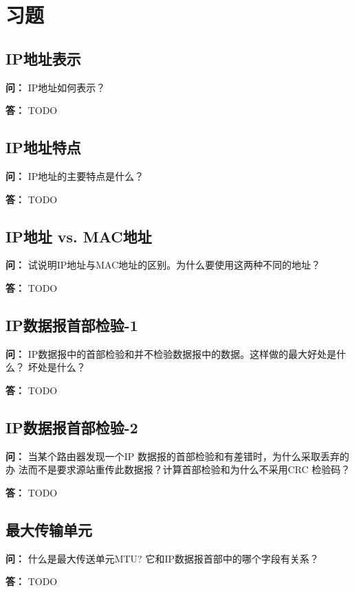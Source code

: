 \documentclass[12pt,hyperref,a4paper,UTF8]{ctexart}
\begin{document}
\section{习题}

\subsection{IP地址表示}
\textbf{问：}
IP地址如何表示？

\textbf{答：}
TODO

\subsection{IP地址特点}
\textbf{问：}
IP地址的主要特点是什么？

\textbf{答：}
TODO

\subsection{IP地址 vs. MAC地址}
\textbf{问：}
试说明IP地址与MAC地址的区别。为什么要使用这两种不同的地址？

\textbf{答：}
TODO

\subsection{IP数据报首部检验-1}
\textbf{问：}
IP数据报中的首部检验和并不检验数据报中的数据。这样做的最大好处是什么？
坏处是什么？

\textbf{答：}
TODO

\subsection{IP数据报首部检验-2}
\textbf{问：}
当某个路由器发现一个IP 数据报的首部检验和有差错时，为什么采取丢弃的办
法而不是要求源站重传此数据报？计算首部检验和为什么不采用CRC 检验码？

\textbf{答：}
TODO

\subsection{最大传输单元}
\textbf{问：}
什么是最大传送单元MTU? 它和IP数据报首部中的哪个字段有关系？

\textbf{答：}
TODO
\end{document}
